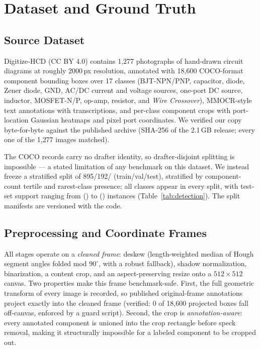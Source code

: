 \section{Dataset and Ground Truth}
\label{sec:dataset}


\subsection{Source Dataset}
Digitize-HCD \cite{digitizehcd_data} (CC BY 4.0) contains 1{,}277
photographs of hand-drawn circuit diagrams at roughly 2000\,px
resolution, annotated with 18{,}600 COCO-format component bounding
boxes over 17 classes (BJT-NPN/PNP, capacitor, diode, Zener diode,
GND, AC/DC current and voltage sources, one-port DC source, inductor,
MOSFET-N/P, op-amp, resistor, and \emph{Wire Crossover}), MMOCR-style
text annotations with transcriptions, and per-class component crops
with port-location Gaussian heatmaps and pixel port coordinates. We
verified our copy byte-for-byte against the published archive (SHA-256
of the 2.1\,GB release; every one of the 1{,}277 images matched).

The COCO records carry no drafter identity, so drafter-disjoint
splitting is impossible — a stated limitation of any benchmark on this
dataset. We instead freeze a stratified split of 895/192/\NumTestImages{}
(train/val/test), stratified by component-count tertile and
rarest-class presence; all \NumClasses{} classes appear in every split,
with test-set support ranging from \SupportMin{}
(\SupportMinClass) to \SupportMax{} (\SupportMaxClass) instances
(Table~\ref{tab:detection}). The split manifests are versioned with the
code.

\subsection{Preprocessing and Coordinate Frames}
All stages operate on a \emph{cleaned frame}: deskew (length-weighted
median of Hough segment angles folded mod $90^\circ$, with a robust
fallback), shadow normalization, binarization, a content crop, and an
aspect-preserving resize onto a $512\times512$ canvas. Two properties
make this frame benchmark-safe. First, the full geometric transform of
every image is recorded, so published original-frame annotations
project exactly into the cleaned frame (verified: 0 of 18{,}600
projected boxes fall off-canvas, enforced by a guard script). Second,
the crop is \emph{annotation-aware}: every annotated component is
unioned into the crop rectangle before speck removal, making it
structurally impossible for a labeled component to be cropped out.

